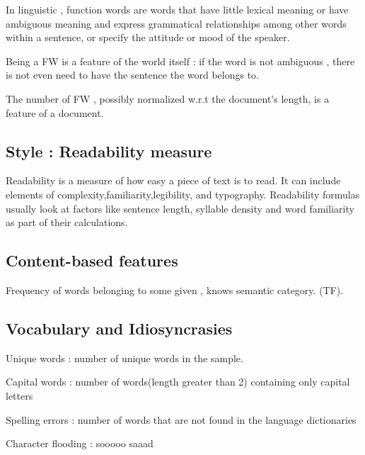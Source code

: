 \documentclass{article}
\begin{document}
In linguistic , function words are words that have little lexical meaning or have ambiguous meaning and express grammatical relationships among other words within a sentence, or specify the attitude or mood of the speaker.

Being a FW is a feature of the world itself : if the word is not ambiguous , there is not even need to have the sentence the word belongs to.

The number of FW , possibly normalized w.r.t the document's length, is a feature of a document.

\subsection{Style : Readability measure}

Readability is a measure of how easy a piece of text is to read. It can include elements of complexity,familiarity,legibility, and typography. Readability formulas usually look at factors like sentence length, syllable density and word familiarity as part of their calculations.

\subsection{Content-based features}

Frequency of words belonging to some given , knows semantic category. (TF).

\subsection{Vocabulary and Idiosyncrasies}

Unique words : number of unique words in the sample.

Capital words : number of words(length greater than 2) containing only capital letters

Spelling errors : number of words that are not found in the language dictionaries

Character flooding : sooooo saaad
\end{document}

